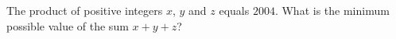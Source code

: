 The product of positive integers $x$, $y$ and $z$ equals $2004$. What is the minimum possible value of the sum $x+y+z$?
